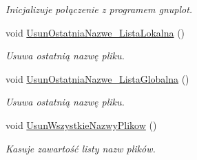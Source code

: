 \begin{DoxyCompactItemize}
$$\begin{DoxyCompactList}\small\item\em Inicjalizuje połączenie z programem {\itshape gnuplot}. \end{DoxyCompactList}\item 
void \mbox{\hyperlink{class_pz_g_1_1_lacze_do_g_n_u_plota_a263a9dba2ef8030028a48217a183ecdf}{Usun\+Ostatnia\+Nazwe\+\_\+\+Lista\+Lokalna}} ()
\begin{DoxyCompactList}\small\item\em Usuwa ostatnią nazwę pliku. \end{DoxyCompactList}\item 
void \mbox{\hyperlink{class_pz_g_1_1_lacze_do_g_n_u_plota_ac9b77a032e256c3143b984509a8b4bb5}{Usun\+Ostatnia\+Nazwe\+\_\+\+Lista\+Globalna}} ()
\begin{DoxyCompactList}\small\item\em Usuwa ostatnią nazwę pliku. \end{DoxyCompactList}\item 
void \mbox{\hyperlink{class_pz_g_1_1_lacze_do_g_n_u_plota_a89a1d90d017d264cd26398464d074073}{Usun\+Wszystkie\+Nazwy\+Plikow}} ()
\begin{DoxyCompactList}\small\item\em Kasuje zawartość listy nazw plików. \end{DoxyCompactList}\end{DoxyCompactItemize}
